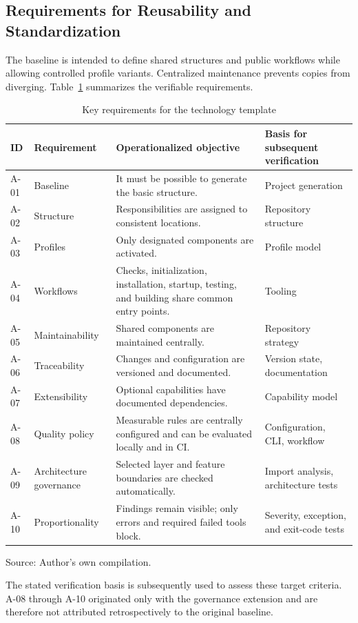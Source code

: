 \subsection{Requirements for Reusability and Standardization}
\label{subsec:wiederverwendbarkeit-standardisierung}

The baseline is intended to define shared structures and public workflows while
allowing controlled profile variants. Centralized maintenance prevents copies
from diverging. Table~\ref{tab:anforderungen-template} summarizes the verifiable
requirements.

\begin{table}[H]
  \centering
  \scriptsize
  \renewcommand{\arraystretch}{1.08}
  \caption{Key requirements for the technology template}
  \label{tab:anforderungen-template}
  \begin{tabularx}{\textwidth}{@{}p{}p{}p{}>{\raggedright\arraybackslash}X@{}}
    \toprule
    \textbf{ID} & \textbf{Requirement} & \textbf{Operationalized objective} & \textbf{Basis for subsequent verification} \\
    \midrule
    A-01 & Baseline & It must be possible to generate the basic structure. & Project generation \\
    A-02 & Structure & Responsibilities are assigned to consistent locations. & Repository structure \\
    A-03 & Profiles & Only designated components are activated. & Profile model \\
    A-04 & Workflows & Checks, initialization, installation, startup, testing, and building share common entry points. & Tooling \\
    A-05 & Maintainability & Shared components are maintained centrally. & Repository strategy \\
    A-06 & Traceability & Changes and configuration are versioned and documented. & Version state, documentation \\
    A-07 & Extensibility & Optional capabilities have documented dependencies. & Capability model \\
    A-08 & Quality policy & Measurable rules are centrally configured and can be evaluated locally and in CI. & Configuration, CLI, workflow \\
    A-09 & Architecture governance & Selected layer and feature boundaries are checked automatically. & Import analysis, architecture tests \\
    A-10 & Proportionality & Findings remain visible; only errors and required failed tools block. & Severity, exception, and exit-code tests \\
    \bottomrule
  \end{tabularx}
  \smallskip
  {\footnotesize Source: Author's own compilation.\par}
\end{table}

The stated verification basis is subsequently used to assess these target
criteria. A-08 through A-10 originated only with the governance extension and
are therefore not attributed retrospectively to the original baseline.
